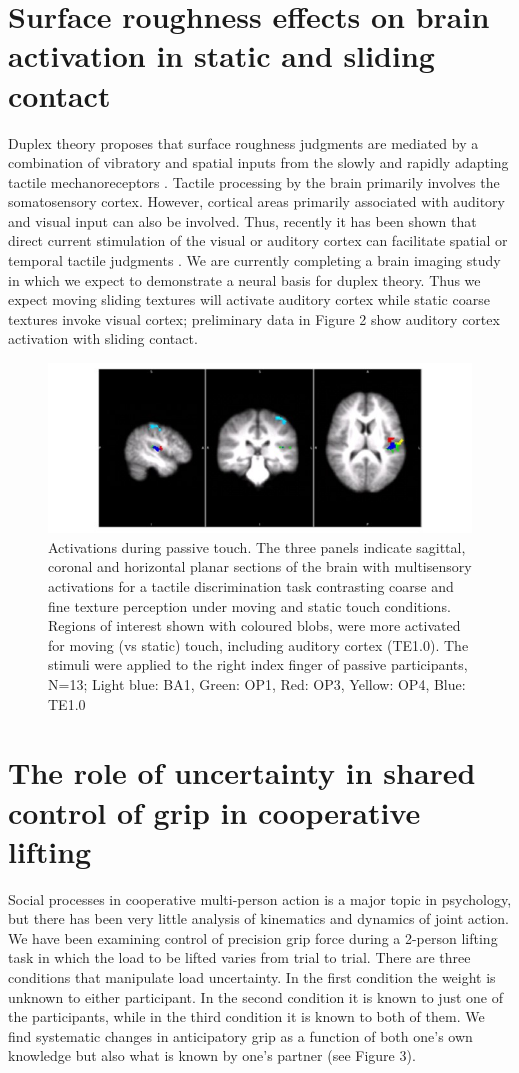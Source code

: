\section {Surface roughness effects on brain activation in static and sliding contact}
Duplex theory proposes that surface roughness judgments are mediated by a combination of vibratory and spatial inputs from the slowly and rapidly adapting tactile mechanoreceptors \cite{Hollins2000}. Tactile processing by the brain primarily involves the somatosensory cortex. However, cortical areas primarily associated with auditory and visual input can also be involved. Thus, recently it has been shown that direct current stimulation of the visual or auditory cortex can facilitate spatial or temporal tactile judgments \cite{yau2014}. We are currently completing a brain imaging study in which we expect to demonstrate a neural basis for duplex theory. Thus we expect moving sliding textures will activate auditory cortex while static coarse textures invoke visual cortex; preliminary data in Figure 2 show auditory cortex activation with sliding contact.
 
\begin{figure}[!h]
  \centering
  \includegraphics[width=.7\textwidth]{Roberta/Figures/Figure2.jpg}
  \caption{Activations during passive touch.  The three panels indicate sagittal, coronal and horizontal planar sections of the brain with multisensory activations for a tactile discrimination task contrasting coarse and fine texture perception under moving and static touch conditions. Regions of interest shown with coloured blobs, were more activated for moving (vs static) touch, including auditory cortex (TE1.0). The stimuli were applied to the right index finger of passive participants, N=13; Light blue: BA1, Green: OP1, Red: OP3, Yellow: OP4, Blue: TE1.0}
  \label{Activations during passive touch}
\end{figure}

\section {The role of uncertainty in shared control of grip in cooperative lifting}
Social processes in cooperative multi-person action is a major topic in psychology, but there has been very little analysis of kinematics and dynamics of joint action. We have been examining control of precision grip force during a 2-person lifting task in which the load to be lifted varies from trial to trial. There are three conditions that manipulate load uncertainty. In the first condition the weight is unknown to either participant. In the second condition it is known to just one of the participants, while in the third condition it is known to both of them.  We find systematic changes in anticipatory grip as a function of both one’s own knowledge but also what is known by one’s partner (see Figure 3).

